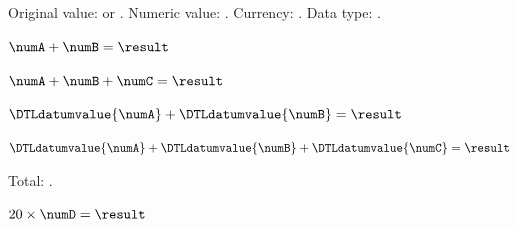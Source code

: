 \documentclass[12pt]{article}
\begin{document}
Original value: \DTLusedatum{\numC} or \numC.
Numeric value: \DTLdatumvalue{\numC}.
Currency: \DTLdatumcurrency{\numC}.
Data type: \number\DTLdatumtype{\numC}. 

\DTLadd{\result}{\numA}{\numB}
$\numA + \numB = \result$ 

\DTLaddall{\result}{\numA,\numB,\numC}
$\numA + \numB + \numC = \result$ 

\dtladd{\result}{\DTLdatumvalue{\numA}}{\DTLdatumvalue{\numB}}
$\DTLdatumvalue{\numA} + \DTLdatumvalue{\numB} = \result$ 

\dtladdall{\result}{\DTLdatumvalue{\numA},\DTLdatumvalue{\numB},\DTLdatumvalue{\numC}}
$\DTLdatumvalue{\numA} + \DTLdatumvalue{\numB} + \DTLdatumvalue{\numC} = \result$ 

\DTLxsetdecimaldatum{\total}{\num{\result}}{\result}
Total: \total. 

$20 \times \numD = \result$ 
\end{document}
